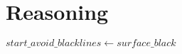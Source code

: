 \section{Reasoning} \label{sec:reasoning}


\hspace{3mm} $start\_avoid\_blacklines \leftarrow surface\_black$

